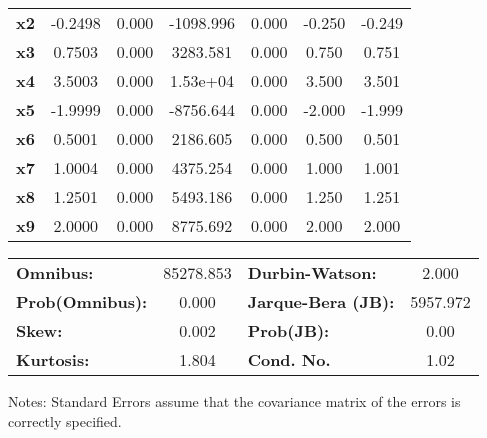 \documentclass{article}
\begin{document}
\begin{center}
\begin{tabular}{lcccccc}
\textbf{x2}    &      -0.2498  &        0.000     & -1098.996  &         0.000        &       -0.250    &       -0.249     \\
\textbf{x3}    &       0.7503  &        0.000     &  3283.581  &         0.000        &        0.750    &        0.751     \\
\textbf{x4}    &       3.5003  &        0.000     &  1.53e+04  &         0.000        &        3.500    &        3.501     \\
\textbf{x5}    &      -1.9999  &        0.000     & -8756.644  &         0.000        &       -2.000    &       -1.999     \\
\textbf{x6}    &       0.5001  &        0.000     &  2186.605  &         0.000        &        0.500    &        0.501     \\
\textbf{x7}    &       1.0004  &        0.000     &  4375.254  &         0.000        &        1.000    &        1.001     \\
\textbf{x8}    &       1.2501  &        0.000     &  5493.186  &         0.000        &        1.250    &        1.251     \\
\textbf{x9}    &       2.0000  &        0.000     &  8775.692  &         0.000        &        2.000    &        2.000     \\
\bottomrule
\end{tabular}
\begin{tabular}{lclc}
\textbf{Omnibus:}       & 85278.853 & \textbf{  Durbin-Watson:     } &    2.000  \\
\textbf{Prob(Omnibus):} &    0.000  & \textbf{  Jarque-Bera (JB):  } & 5957.972  \\
\textbf{Skew:}          &    0.002  & \textbf{  Prob(JB):          } &     0.00  \\
\textbf{Kurtosis:}      &    1.804  & \textbf{  Cond. No.          } &     1.02  \\
\bottomrule
\end{tabular}
\end{center}

Notes: \newline
 [1] Standard Errors assume that the covariance matrix of the errors is correctly specified.
\end{document}
